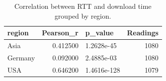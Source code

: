 \begin{table}
\caption{Correlation between RTT and download time grouped by region.}
\label{tab:correlation_by_region}
\begin{tabular}{lrlr}
\toprule
region & Pearson_r & p_value & Readings \\
\midrule
Asia & 0.412500 & 1.2628e-45 & 1080 \\
Germany & 0.092000 & 2.4885e-03 & 1080 \\
USA & 0.646200 & 1.4616e-128 & 1079 \\
\bottomrule
\end{tabular}
\end{table}
